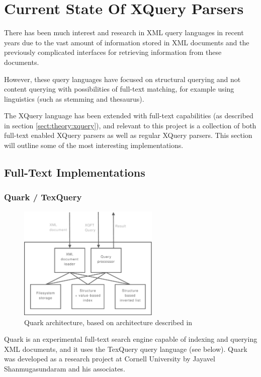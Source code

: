 \section{Current State Of XQuery Parsers}
\label{sect:theory:stateoftheart}
There has been much interest and research in XML query languages in recent
years due to the vast amount of information stored in XML documents and the
previously complicated interfaces for retrieving information from these documents.

However, these query languages have focused on structural querying and not
content querying with possibilities of full-text matching, for example using
linguistics (such as stemming and thesaurus).

The XQuery language has been extended with full-text capabilities (as described
in section \ref{sect:theory:xquery}), and relevant to this project is a
collection of both full-text enabled XQuery parsers as well as regular XQuery
parsers. This section will outline some of the most interesting implementations.

\subsection{Full-Text Implementations}
\subsubsection{Quark / TexQuery}
\begin{figure}[!h]
  \centering
    \includegraphics[width=0.6\textwidth]{diagrams/quark_arch}
  \caption[Quark architecture]{Quark architecture, based on architecture described in
  \cite{quark_efficientxquery}}
\end{figure}

Quark is an experimental full-text search engine capable of indexing and
querying XML documents, and it uses the TexQuery query language (see below). 
Quark was developed as a research project at Cornell University by Jayavel 
Shanmugasundaram and his associates.

